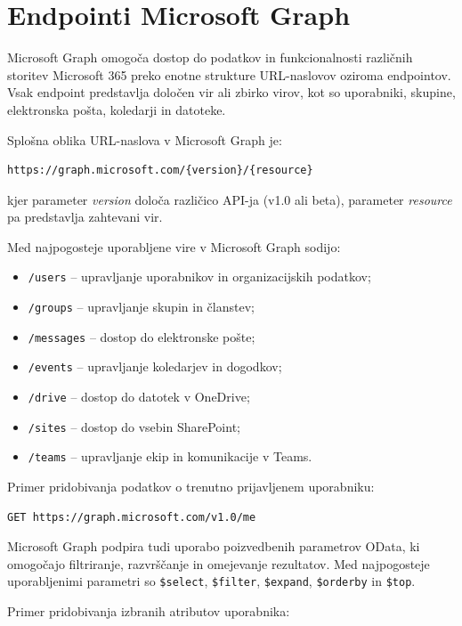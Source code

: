\documentclass[a4paper, 12pt]{book}
\begin{document}
\section{Endpointi Microsoft Graph}
Microsoft Graph omogoča dostop do podatkov in funkcionalnosti različnih storitev Microsoft 365 preko enotne strukture URL-naslovov oziroma endpointov. Vsak endpoint predstavlja določen vir ali zbirko virov, kot so uporabniki, skupine, elektronska pošta, koledarji in datoteke.

Splošna oblika URL-naslova v Microsoft Graph je:

\begin{verbatim}
https://graph.microsoft.com/{version}/{resource}
\end{verbatim}
kjer parameter \textit{version} določa različico API-ja (v1.0 ali beta), parameter \textit{resource} pa predstavlja zahtevani vir.

Med najpogosteje uporabljene vire v Microsoft Graph sodijo:

\begin{itemize}
    \item \texttt{/users} -- upravljanje uporabnikov in organizacijskih podatkov;
    \item \texttt{/groups} -- upravljanje skupin in članstev;
    \item \texttt{/messages} -- dostop do elektronske pošte;
    \item \texttt{/events} -- upravljanje koledarjev in dogodkov;
    \item \texttt{/drive} -- dostop do datotek v OneDrive;
    \item \texttt{/sites} -- dostop do vsebin SharePoint;
    \item \texttt{/teams} -- upravljanje ekip in komunikacije v Teams.
\end{itemize}

Primer pridobivanja podatkov o trenutno prijavljenem uporabniku:

\begin{verbatim}
GET https://graph.microsoft.com/v1.0/me
\end{verbatim}


Microsoft Graph podpira tudi uporabo poizvedbenih parametrov OData, ki omogočajo filtriranje, razvrščanje in omejevanje rezultatov. Med najpogosteje uporabljenimi parametri so \texttt{\$select}, \texttt{\$filter}, \texttt{\$expand}, \texttt{\$orderby} in \texttt{\$top}.


Primer pridobivanja izbranih atributov uporabnika:
\end{document}
